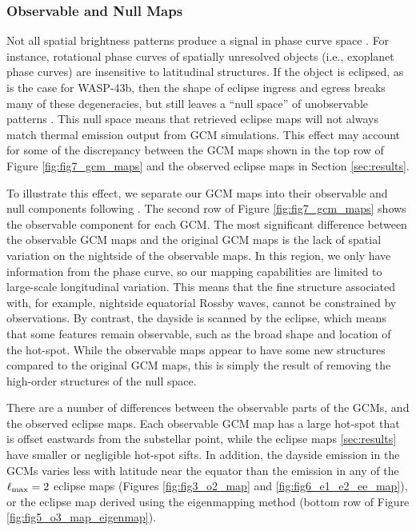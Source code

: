 \documentclass[twocolumn]{aastex631}
\begin{document}
\subsubsection{Observable and Null Maps}

Not all spatial brightness patterns produce a signal in phase curve space \citep{luger2021nullspace}. For instance, rotational phase curves of spatially unresolved objects (i.e., exoplanet phase curves) are insensitive to latitudinal structures. If the object is eclipsed, as is the case for WASP-43b, then the shape of eclipse ingress and egress breaks many of these degeneracies, but still leaves a ``null space'' of unobservable patterns \citep{challener2023nullspace}. This null space means that retrieved eclipse maps will not always match thermal emission output from GCM simulations. This effect may account for some of the discrepancy between the GCM maps shown in the top row of Figure \ref{fig:fig7_gcm_maps} and the observed eclipse maps in Section \ref{sec:results}. 

To illustrate this effect, we separate our GCM maps into their observable and null components following \citet{challener2023nullspace}. The second row of Figure \ref{fig:fig7_gcm_maps} shows the observable component for each GCM. The most significant difference between the observable GCM maps and the original GCM maps is the lack of spatial variation on the nightside of the observable maps. In this region, we only have information from the phase curve, so our mapping capabilities are limited to large-scale longitudinal variation. This means that the fine structure associated with, for example, nightside equatorial Rossby waves, cannot be constrained by observations. By contrast, the dayside is scanned by the eclipse, which means that some features remain observable, such as the broad shape and location of the hot-spot. While the observable maps appear to have some new structures compared to the original GCM maps, this is simply the result of removing the high-order structures of the null space. 

There are a number of differences between the observable parts of the GCMs, and the observed eclipse maps. Each observable GCM map has a large hot-spot that is offset eastwards from the substellar point, while the eclipse maps \ref{sec:results} have smaller or negligible hot-spot sifts. In addition, the dayside emission in the GCMs varies less with latitude near the equator than the emission in any of the $\ell_{\rm max}=2$ eclipse maps (Figures \ref{fig:fig3_o2_map} and \ref{fig:fig6_e1_e2_ee_map}), or the eclipse map derived using the eigenmapping method (bottom row of Figure \ref{fig:fig5_o3_map_eigenmap}).
\end{document}
